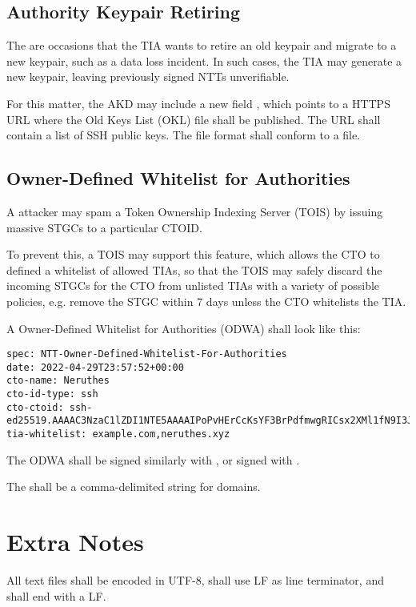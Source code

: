 \documentclass[a4paper,10pt]{article}
\begin{document}
\subsection{Authority Keypair Retiring}

The are occasions that the TIA wants to retire an old keypair and migrate to a new keypair, such as a data loss incident.
In such cases, the TIA may generate a new keypair, leaving previously signed NTTs unverifiable.

For this matter, the AKD may include a new field ,
which points to a HTTPS URL where the Old Keys List (OKL) file shall be published.
The URL shall contain a list of SSH public keys.
The file format shall conform to a  file.


\subsection{Owner-Defined Whitelist for Authorities}

A attacker may spam a Token Ownership Indexing Server (TOIS) by issuing massive STGCs to a particular CTOID.

To prevent this, a TOIS may support this feature, which allows the CTO to defined a whitelist of allowed TIAs,
so that the TOIS may safely discard the incoming STGCs for the CTO from unlisted TIAs with a variety of possible policies,
e.g. remove the STGC within 7 days unless the CTO whitelists the TIA.

A Owner-Defined Whitelist for Authorities (ODWA) shall look like this:

\begin{lstlisting}
spec: NTT-Owner-Defined-Whitelist-For-Authorities
date: 2022-04-29T23:57:52+00:00
cto-name: Neruthes
cto-id-type: ssh
cto-ctoid: ssh-ed25519.AAAAC3NzaC1lZDI1NTE5AAAAIPoPvHErCcKsYF3BrPdfmwgRICsx2XMl1fN9I3Jg1pPA
tia-whitelist: example.com,neruthes.xyz
\end{lstlisting}

The ODWA shall be signed similarly with , or signed with .

The  shall be a comma-delimited string for domains.










\section{Extra Notes}

\begin{compactitem}
	\item All text files shall be encoded in UTF-8, shall use LF as line terminator, and shall end with a LF.
\end{compactitem}
\end{document}
